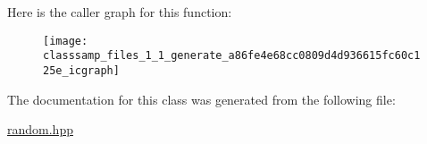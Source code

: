 Here is the caller graph for this function\+:\nopagebreak
\begin{figure}[H]
\begin{center}
\leavevmode
\texttt{[image: classsamp\_files\_1\_1\_generate\_a86fe4e68cc0809d4d936615fc60c125e\_icgraph]}
\end{center}
\end{figure}


The documentation for this class was generated from the following file\+:\begin{DoxyCompactItemize}
\item 
\hyperlink{random_8hpp}{random.\+hpp}\end{DoxyCompactItemize}
